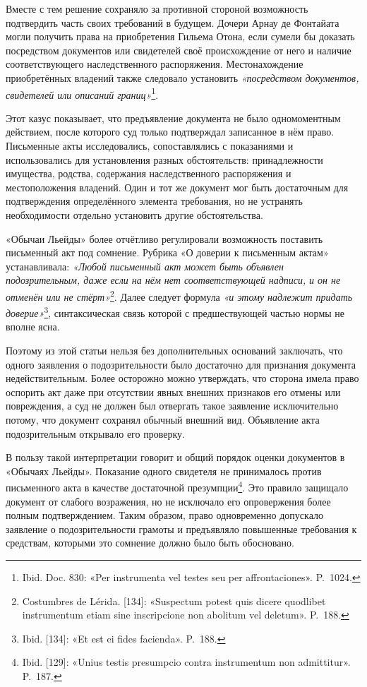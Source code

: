 Вместе с тем решение сохраняло за противной стороной возможность подтвердить часть своих требований в будущем. Дочери Арнау де Фонтайата могли получить права на приобретения Гильема Отона, если сумели бы доказать посредством документов или свидетелей своё происхождение от него и наличие соответствующего наследственного распоряжения. Местонахождение приобретённых владений также следовало установить\emph{ «посредством документов, свидетелей или описаний границ»}\footnote{Ibid. Doc. 830: «Per instrumenta vel testes seu per affrontaciones». P.~1024.}.

Этот казус показывает, что предъявление документа не было одномоментным действием, после которого суд только подтверждал записанное в нём право. Письменные акты исследовались, сопоставлялись с показаниями и использовались для установления разных обстоятельств: принадлежности имущества, родства, содержания наследственного распоряжения и местоположения владений. Один и тот же документ мог быть достаточным для подтверждения определённого элемента требования, но не устранять необходимости отдельно установить другие обстоятельства.

«Обычаи Льейды» более отчётливо регулировали возможность поставить письменный акт под сомнение. Рубрика «О доверии к письменным актам» устанавливала: \emph{«Любой письменный акт может быть объявлен подозрительным, даже если на нём нет соответствующей надписи}\emph{,}\emph{ и он не отменён или не стёрт»}\footnote{Costumbres de Lérida. [134]: «Suspectum potest quis dicere quodlibet instrumentum etiam sine inscripcione non abolitum vel deletum». P.~188.}. Далее следует формула \emph{«и этому надлежит придать доверие»}\footnote{Ibid. [134]: «Et est ei fides facienda». P.~188.}, синтаксическая связь которой с предшествующей частью нормы не вполне ясна.

Поэтому из этой статьи нельзя без дополнительных оснований заключать, что одного заявления о подозрительности было достаточно для признания документа недействительным. Более осторожно можно утверждать, что сторона имела право оспорить акт даже при отсутствии явных внешних признаков его отмены или повреждения, а суд не должен был отвергать такое заявление исключительно потому, что документ сохранял обычный внешний вид. Объявление акта подозрительным открывало его проверку.

В пользу такой интерпретации говорит и общий порядок оценки документов в «Обычаях Льейды». Показание одного свидетеля не принималось против письменного акта в качестве достаточной презумпции\footnote{Ibid. [129]: «Unius testis presumpcio contra instrumentum non admittitur». P.~187.}. Это правило защищало документ от слабого возражения, но не исключало его опровержения более полным подтверждением. Таким образом, право одновременно допускало заявление о подозрительности грамоты и предъявляло повышенные требования к средствам, которыми это сомнение должно было быть обосновано.

